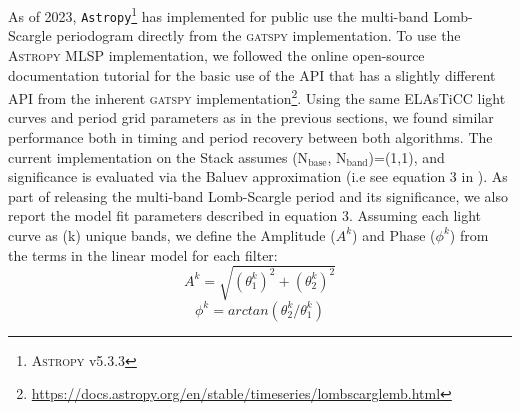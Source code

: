 \documentclass[DM,authoryear,toc]{lsstdoc}
\begin{document}
As of 2023, \texttt{Astropy}\footnote{\textsc{Astropy} v5.3.3} has implemented for public use the multi-band Lomb-Scargle periodogram directly from the \textsc{gatspy} implementation. To use the \textsc{Astropy} MLSP implementation, we followed the online open-source documentation tutorial for the basic use of the API that has a slightly different API from the inherent \textsc{gatspy} implementation\footnote{\href{https://docs.astropy.org/en/stable/timeseries/lombscarglemb.html}{https://docs.astropy.org/en/stable/timeseries/lombscarglemb.html}}. Using the same  ELAsTiCC light curves and period grid parameters as in the previous sections, we found similar performance both in timing and period recovery between both algorithms. The current implementation on the Stack assumes (N$_{\text{base}}$, N$_{\text{band}}$)=(1,1), and significance is evaluated via the Baluev approximation (i.e see equation 3 in \citet{Suveges:Suveges15}). As part of releasing the multi-band Lomb-Scargle period and its significance, we also report the model fit parameters described in equation 3. Assuming each light curve as (k) unique bands, we define the Amplitude ($A^{k}$) and Phase ($\phi^{k}$) from the terms in the linear model for each filter: 
\begin{equation}
A^{k} = \sqrt{(\theta_{1}^{k})^2 + (\theta_{2}^{k})^2}
\end{equation}
\begin{equation}
\phi^{k} = arctan(\theta_2^{k}/\theta_{1}^{k})
\end{equation}
\end{document}
